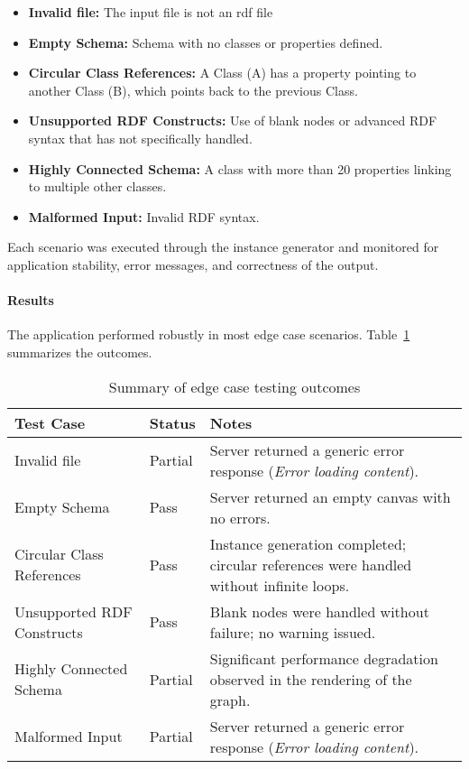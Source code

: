 \begin{itemize}
    \item \textbf{Invalid file:} The input file is not an rdf file
    \item \textbf{Empty Schema:} Schema with no classes or properties defined.
    \item \textbf{Circular Class References:} A Class (A) has a property pointing to another Class (B), which points back to the previous Class.
    \item \textbf{Unsupported RDF Constructs:} Use of blank nodes or advanced RDF syntax that has not specifically handled.
    \item \textbf{Highly Connected Schema:} A class with more than 20 properties linking to multiple other classes.
    \item \textbf{Malformed Input:} Invalid RDF syntax.
\end{itemize}

Each scenario was executed through the instance generator and monitored for application stability, error messages, and correctness of the output.

\paragraph{Results}
The application performed robustly in most edge case scenarios. Table~\ref{tab:edge-case-results} summarizes the outcomes.

\begin{table}[H]
\centering
\begin{tabular}{|p{4.5cm}|p{3cm}|p{6cm}|}
\hline

\textbf{Test Case} & \textbf{Status} & \textbf{Notes} \\ \hline 
Invalid file & Partial & Server returned a generic error response (\textit{Error loading content}). \\ \hline
Empty Schema & Pass & Server returned an empty canvas with no errors. \\ \hline
Circular Class References & Pass & Instance generation completed; circular references were handled without infinite loops. \\ \hline
Unsupported RDF Constructs & Pass & Blank nodes were handled without failure; no warning issued. \\ \hline
Highly Connected Schema & Partial & Significant performance degradation observed in the rendering of the graph. \\ \hline
Malformed Input & Partial & Server returned a generic error response (\textit{Error loading content}). \\ \hline
\end{tabular}
\caption{Summary of edge case testing outcomes}
\label{tab:edge-case-results}
\end{table}

